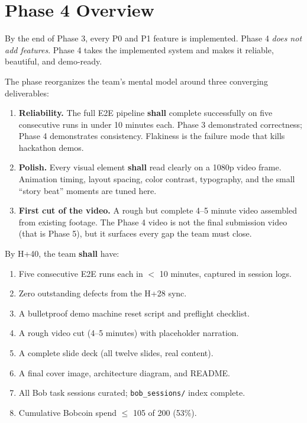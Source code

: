 \documentclass[11pt,letterpaper]{article}
\newcommand{\shall}{\textbf{shall}}
\begin{document}
{\hypersetup{linkcolor=ibmdark}\tableofcontents}
\newpage

\section{Phase 4 Overview}

By the end of Phase 3, every P0 and P1 feature is implemented. Phase 4 \textit{does not add features}. Phase 4 takes the implemented system and makes it reliable, beautiful, and demo-ready.

The phase reorganizes the team's mental model around three converging deliverables:

\begin{enumerate}
  \item \textbf{Reliability.} The full E2E pipeline \shall{} complete successfully on five consecutive runs in under 10 minutes each. Phase 3 demonstrated correctness; Phase 4 demonstrates consistency. Flakiness is the failure mode that kills hackathon demos.
  \item \textbf{Polish.} Every visual element \shall{} read clearly on a 1080p video frame. Animation timing, layout spacing, color contrast, typography, and the small ``story beat'' moments are tuned here.
  \item \textbf{First cut of the video.} A rough but complete 4--5 minute video assembled from existing footage. The Phase 4 video is not the final submission video (that is Phase 5), but it surfaces every gap the team must close.
\end{enumerate}

By H+40, the team \shall{} have:

\begin{enumerate}
  \item Five consecutive E2E runs each in $<$ 10 minutes, captured in session logs.
  \item Zero outstanding defects from the H+28 sync.
  \item A bulletproof demo machine reset script and preflight checklist.
  \item A rough video cut (4--5 minutes) with placeholder narration.
  \item A complete slide deck (all twelve slides, real content).
  \item A final cover image, architecture diagram, and README.
  \item All Bob task sessions curated; \texttt{bob\_sessions/} index complete.
  \item Cumulative Bobcoin spend $\leq$ 105 of 200 (53\%).
\end{enumerate}
\end{document}
